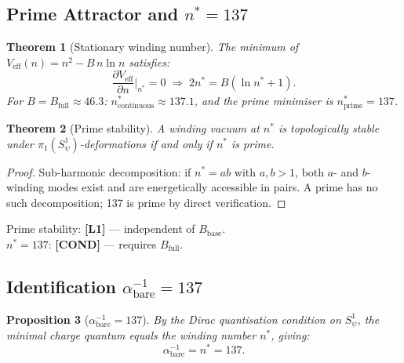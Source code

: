 \documentclass[12pt,a4paper]{article}
\newtheorem{theorem}{Theorem}[section]
\newtheorem{proposition}[theorem]{Proposition}
\theoremstyle{definition}
\theoremstyle{remark}
\begin{document}
\subsection{Prime Attractor and $n^* = 137$}

\begin{theorem}[Stationary winding number]
\label{thm:g5:nstar}
The minimum of $V_\mathrm{eff}(n) = n^2 - B\,n\ln n$ satisfies:
\begin{equation}
  \frac{\partial V_\mathrm{eff}}{\partial n}\bigg|_{n^*} = 0
  \;\Longrightarrow\;
  2n^* = B(\ln n^* + 1).
  \label{eq:g5:nstar}
\end{equation}
For $B = B_\mathrm{full} \approx 46.3$: $n^*_\mathrm{continuous} \approx 137.1$,
and the prime minimiser is $n^*_\mathrm{prime} = 137$.
\end{theorem}

\begin{theorem}[Prime stability]
\label{thm:g5:prime}
A winding vacuum at $n^*$ is topologically stable under $\pi_1(S^1_\psi)$-deformations
if and only if $n^*$ is prime.
\end{theorem}

\begin{proof}
Sub-harmonic decomposition: if $n^* = ab$ with $a,b > 1$, both $a$- and $b$-winding
modes exist and are energetically accessible in pairs.  A prime has no such
decomposition; 137 is prime by direct verification.
\end{proof}

\begin{resultbox}
Prime stability: \textbf{[L1]} — independent of $B_\mathrm{base}$.\\
$n^* = 137$: \textbf{[COND]} — requires $B_\mathrm{full}$.
\end{resultbox}

\subsection{Identification $\alpha^{-1}_\mathrm{bare} = 137$}

\begin{proposition}[$\alpha^{-1}_\mathrm{bare} = 137$]
\label{prop:g5:alpha}
By the Dirac quantisation condition on $S^1_\psi$, the minimal charge quantum equals
the winding number $n^*$, giving:
\begin{equation}
  \alpha^{-1}_\mathrm{bare} = n^* = 137.
  \label{eq:g5:alpha}
\end{equation}
\end{proposition}
\end{document}
